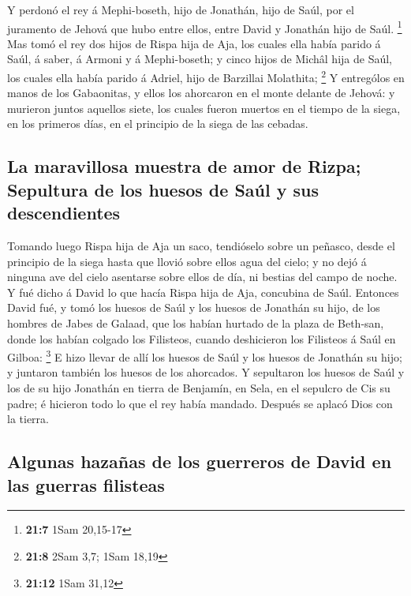  Y perdonó el rey á Mephi-boseth, hijo de Jonathán, hijo de
Saúl, por el juramento de Jehová que hubo entre ellos, entre David y
Jonathán hijo de Saúl. \footnote{\textbf{21:7} 1Sam 20,15-17}
 Mas tomó el rey dos hijos de Rispa hija de Aja, los cuales
ella había parido á Saúl, á saber, á Armoni y á Mephi-boseth; y cinco
hijos de Michâl hija de Saúl, los cuales ella había parido á Adriel,
hijo de Barzillai Molathita; \footnote{\textbf{21:8} 2Sam 3,7; 1Sam
  18,19}  Y entrególos en manos de los Gabaonitas, y ellos
los ahorcaron en el monte delante de Jehová: y murieron juntos aquellos
siete, los cuales fueron muertos en el tiempo de la siega, en los
primeros días, en el principio de la siega de las cebadas.

\hypertarget{la-maravillosa-muestra-de-amor-de-rizpa-sepultura-de-los-huesos-de-sauxfal-y-sus-descendientes}{%
\subsection{La maravillosa muestra de amor de Rizpa; Sepultura de los
huesos de Saúl y sus
descendientes}\label{la-maravillosa-muestra-de-amor-de-rizpa-sepultura-de-los-huesos-de-sauxfal-y-sus-descendientes}}

 Tomando luego Rispa hija de Aja un saco, tendióselo sobre
un peñasco, desde el principio de la siega hasta que llovió sobre ellos
agua del cielo; y no dejó á ninguna ave del cielo asentarse sobre ellos
de día, ni bestias del campo de noche.  Y fué dicho á David
lo que hacía Rispa hija de Aja, concubina de Saúl. 
Entonces David fué, y tomó los huesos de Saúl y los huesos de Jonathán
su hijo, de los hombres de Jabes de Galaad, que los habían hurtado de la
plaza de Beth-san, donde los habían colgado los Filisteos, cuando
deshicieron los Filisteos á Saúl en Gilboa: \footnote{\textbf{21:12}
  1Sam 31,12}  E hizo llevar de allí los huesos de Saúl y
los huesos de Jonathán su hijo; y juntaron también los huesos de los
ahorcados.  Y sepultaron los huesos de Saúl y los de su
hijo Jonathán en tierra de Benjamín, en Sela, en el sepulcro de Cis su
padre; é hicieron todo lo que el rey había mandado. Después se aplacó
Dios con la tierra.

\hypertarget{algunas-hazauxf1as-de-los-guerreros-de-david-en-las-guerras-filisteas}{%
\subsection{Algunas hazañas de los guerreros de David en las guerras
filisteas}\label{algunas-hazauxf1as-de-los-guerreros-de-david-en-las-guerras-filisteas}}

